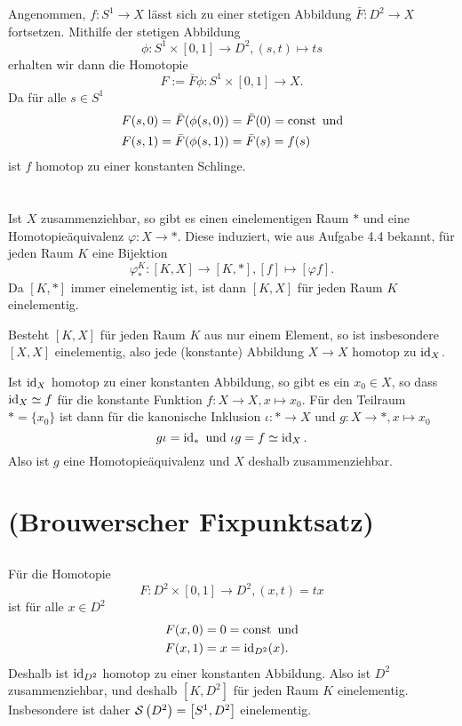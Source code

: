 \documentclass[a4paper,10pt]{article}
\begin{document}
Angenommen, $f: S^1 \to X$ lässt sich zu einer stetigen Abbildung $\bar{F} : D^2 \to X$ fortsetzen. Mithilfe der stetigen Abbildung
\[
 \phi: S^1 \times [0,1] \to D^2, (s,t) \mapsto ts
\]
erhalten wir dann die Homotopie
\[
 F := \bar{F} \phi : S^1 \times [0,1] \to X.
\]
Da für alle $s \in S^1$
\begin{align*}
 F(s,0) &= \bar{F}(\phi(s,0)) = \bar{F}(0) = \operatorname{const} \text{ und} \\
 F(s,1) &= \bar{F}(\phi(s,1)) = \bar{F}(s) = f(s)
\end{align*}
ist $f$ homotop zu einer konstanten Schlinge.





\section{}
Ist $X$ zusammenziehbar, so gibt es einen einelementigen Raum $\ast$ und eine Homotopieäquivalenz $\varphi : X \to \ast$. Diese induziert, wie aus Aufgabe 4.4 bekannt, für jeden Raum $K$ eine Bijektion
\[
 \varphi^K_* :  [K,X] \to [K,\ast], [f] \mapsto [\varphi f].
\]
Da $[K, \ast]$ immer einelementig ist, ist dann $[K,X]$ für jeden Raum $K$ einelementig.

Besteht $[K,X]$ für jeden Raum $K$ aus nur einem Element, so ist insbesondere $[X,X]$ einelementig, also jede (konstante) Abbildung $X \to X$ homotop zu $\operatorname{id}_X$.

Ist $\operatorname{id}_X$ homotop zu einer konstanten Abbildung, so gibt es ein $x_0 \in X$, so dass $\operatorname{id}_X \simeq f$ für die konstante Funktion $f : X \to X, x \mapsto x_0$. Für den Teilraum $\ast = \{x_0\}$ ist dann für die kanonische Inklusion $\iota : \ast \to X$ und $g : X \to \ast, x \mapsto x_0$
\[
 g \iota = \operatorname{id}_{\ast} \text{ und } \iota g = f \simeq \operatorname{id}_X.
\]
Also ist $g$ eine Homotopieäquivalenz und $X$ deshalb zusammenziehbar.






\section{(Brouwerscher Fixpunktsatz)}


\subsection{}
Für die Homotopie
\[
 F: D^2 \times [0,1] \to D^2, (x,t) = tx
\]
ist für alle $x \in D^2$
\begin{align*}
 F(x,0) &= 0 = \operatorname{const} \text{ und}\\
 F(x,1) &= x = \operatorname{id}_{D^2}(x).
\end{align*}
Deshalb ist $\operatorname{id}_{D^2}$ homotop zu einer konstanten Abbildung. Also ist $D^2$ zusammenziehbar, und deshalb $\left[ K,D^2 \right]$ für jeden Raum $K$ einelementig. Insbesondere ist daher $\mathcal{S}\left(D^2\right) = \left[ S^1, D^2 \right]$ einelementig.
\end{document}
